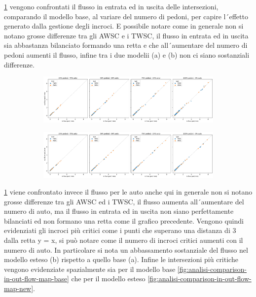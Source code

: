 \ref*{fig:analisi-comparison-in-out-flow-ped} vengono confrontati il flusso in entrata ed in uscita delle intersezioni,
comparando il modello base, al variare del numero di pedoni, per capire l´effetto generato dalla gestione degli incroci.
E possibile notare come in generale non si notano grosse differenze tra gli AWSC e i TWSC, 
il flusso in entrata ed in uscita sia abbastanza bilanciato formando una retta e che all´aumentare
del numero di pedoni aumenti il flusso, infine tra i due modelii (a) e (b) non ci siano sostanziali differenze.

\begin{figure}
    \centering
    \begin{subfigure}{0.99\textwidth}
        \centering
        \includegraphics[width=\textwidth]{images/analisi/comparison-base-in-out-flow-ped.png}
        \caption{}
    \end{subfigure}
    \begin{subfigure}{0.99\textwidth}
        \centering
        \includegraphics[width=\textwidth]{images/analisi/comparison-new-in-out-flow-ped.png}
        \caption{}
    \end{subfigure}
    \caption{}
    \label{fig:analisi-comparison-in-out-flow-ped}
\end{figure}

\ref*{fig:analisi-comparison-in-out-flow-ped} viene confrontato invece il flusso per le auto anche
qui in generale non si notano grosse differenze tra gli AWSC ed i TWSC, il flusso aumenta all´aumentare del numero di auto,
ma il flusso in entrata ed in uscita non siano perfettamente bilanciati ed non
formano una retta come il grafico precedente.
Vengono quindi evidenziati gli incroci più critici come i punti che superano una distanza di 3 dalla retta y = x,
si può notare come il numero di incroci critici aumenti con il numero di auto.
In particolare si nota un abbassamento sostanziale del flusso nel modello esteso (b)
rispetto a quello base (a).
Infine le intersezioni più critiche vengono evidenziate spazialmente sia per il modello base 
\ref*{fig:analisi-comparison-in-out-flow-map-base} che per il modello esteso \ref*{fig:analisi-comparison-in-out-flow-map-new}.

